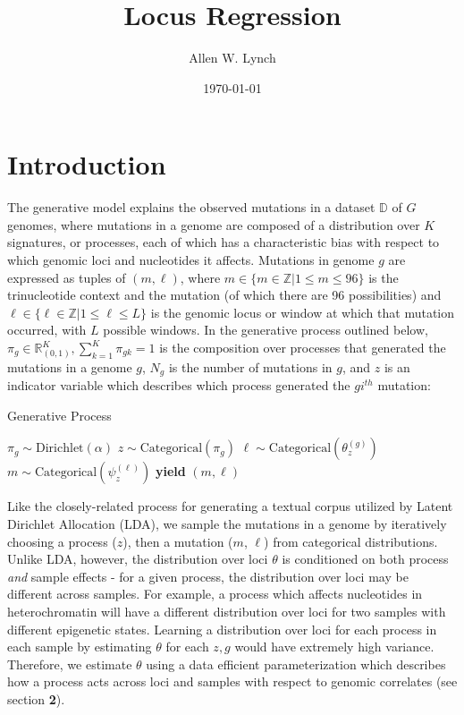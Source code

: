 \documentclass{article}
\author{Allen W. Lynch}
\title{Locus Regression}
\date{\today}
\begin{document}
\maketitle

\section{Introduction}

The generative model explains the observed mutations in a dataset $\mathbb{D}$ of $G$ genomes, where mutations in a genome are composed of a 
distribution over $K$ signatures, or processes, each of which has a characteristic bias with respect to which genomic loci and nucleotides it affects. 
Mutations in genome $g$ are expressed as tuples of $(m,\ell)$, where $m \in \{ m \in \mathbb{Z} | 1 \leq m \leq 96\}$ is the trinucleotide context and the mutation (of which there are 96 possibilities)
and $\ell \in \{ \ell \in \mathbb{Z} | 1 \leq \ell \leq L \}$ is the genomic locus or window at which that mutation occurred, with $L$ possible windows. 
In the generative process outlined below, $\pi_g \in \mathbb{R}_{(0,1)}^K, \sum_{k=1}^K \pi_{gk} = 1$ is the composition over processes that generated the mutations in a genome $g$,
$N_g$ is the number of mutations in $g$, and $z$ is an indicator variable which describes which process generated the $gi^{th}$ mutation:

\begin{algorithm}
\caption{Generative Process}
\begin{algorithmic}
  \scriptsize
  	\STATE $ \pi_g \sim \textrm{Dirichlet}( \alpha ) $
  		\STATE $ z \sim \textrm{Categorical}( \pi_g ) $
  		\STATE $ \ell \sim \textrm{Categorical}( \theta^{(g)}_{z} ) $
  		\STATE $ m \sim \textrm{Categorical}( \psi^{(\ell)}_z ) $
  		\STATE \textbf{yield} $(m,\ell)$
  	\ENDFOR
  \ENDFOR
\end{algorithmic}
\end{algorithm}

Like the closely-related process for generating a textual corpus utilized by Latent Dirichlet Allocation (LDA), we sample the mutations in a genome by
iteratively choosing a process ($z$), then a mutation ($m$, $\ell$) from categorical distributions. Unlike LDA, however, the distribution over loci $\theta$ 
is conditioned on both process \emph{and} sample effects - for a given process, the distribution over loci may be different across samples. For example, a process which
affects nucleotides in heterochromatin will have a different distribution over loci for two samples with different epigenetic states. Learning a distribution over loci for 
each process in each sample by estimating $\theta$ for each $z,g$ would have extremely high variance.
Therefore, we estimate $\theta$ using a data efficient parameterization which describes how a process acts across loci and samples with respect to genomic correlates (see section \textbf{2}).
\end{document}
